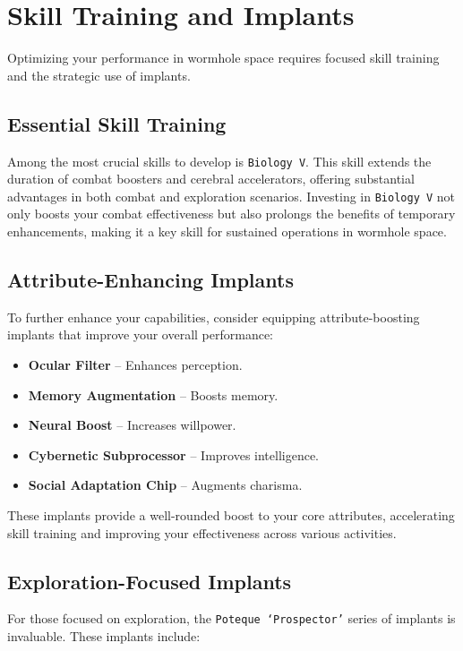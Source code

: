 \documentclass[a4paper,12pt]{report}
\begin{document}
\chapter{Skill Training and Implants}

Optimizing your performance in wormhole space requires focused skill training and the strategic use of implants.

\section{Essential Skill Training}

Among the most crucial skills to develop is \texttt{Biology V}. This skill extends the duration of combat boosters and cerebral accelerators, offering substantial advantages in both combat and exploration scenarios. Investing in \texttt{Biology V} not only boosts your combat effectiveness but also prolongs the benefits of temporary enhancements, making it a key skill for sustained operations in wormhole space.

\section{Attribute-Enhancing Implants}

To further enhance your capabilities, consider equipping attribute-boosting implants that improve your overall performance:

\begin{itemize}
    \item \textbf{Ocular Filter} – Enhances perception.
    \item \textbf{Memory Augmentation} – Boosts memory.
    \item \textbf{Neural Boost} – Increases willpower.
    \item \textbf{Cybernetic Subprocessor} – Improves intelligence.
    \item \textbf{Social Adaptation Chip} – Augments charisma.
\end{itemize}

These implants provide a well-rounded boost to your core attributes, accelerating skill training and improving your effectiveness across various activities.

\section{Exploration-Focused Implants}

For those focused on exploration, the \texttt{Poteque ‘Prospector’} series of implants is invaluable. These implants include:
\end{document}
